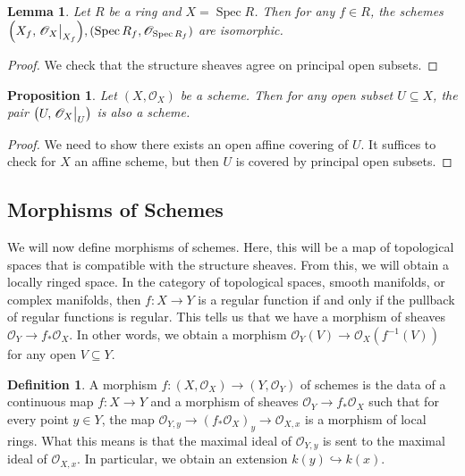 \documentclass[leqno, openany]{memoir}
\newtheorem{prop}[thm]{Proposition}
\newtheorem{lem}[thm]{Lemma}
\theoremstyle{definition}
\newtheorem{defn}[thm]{Definition}
\theoremstyle{remark}
\theoremstyle{plain}
\theoremstyle{definition}
\theoremstyle{remark}
\newcommand{\msc}[1]{\mathscr{#1}}
\DeclareMathOperator{\Spec}{Spec}
\begin{document}
\begin{lem}
    Let $R$ be a ring and $X = \Spec R$. Then for any $f \in R$, the schemes $\qty(X_f, \eval{\msc{O}_X}_{X_f}), (\Spec R_f, \msc{O}_{\Spec R_f})$ are isomorphic.
\end{lem}

\begin{proof}
    We check that the structure sheaves agree on principal open subsets.
\end{proof}

\begin{prop}
    Let $(X, \msc{O}_X)$ be a scheme. Then for any open subset $U \subseteq X$, the pair $\qty(U, \eval{\msc{O}_X}_{U})$ is also a scheme.
\end{prop}

\begin{proof}
    We need to show there exists an open affine covering of $U$. It suffices to check for $X$ an affine scheme, but then $U$ is covered by principal open subsets.
\end{proof}

\subsection{Morphisms of Schemes}%
\label{sub:morphisms_of_schemes}

We will now define morphisms of schemes. Here, this will be a map of topological spaces that is compatible with the structure sheaves. From this, we will obtain a locally ringed space. In the category of topological spaces, smooth manifolds, or complex manifolds, then $f \colon X \to Y$ is a regular function if and only if the pullback of regular functions is regular. This tells us that we have a morphism of sheaves $\msc{O}_Y \to f_* \msc{O}_X$. In other words, we obtain a morphism $\msc{O}_Y(V) \to \msc{O}_X(f^{-1}(V))$ for any open $V \subseteq Y$.

\begin{defn}
    A morphism $f \colon (X, \msc{O}_X) \to (Y, \msc{O}_Y)$ of schemes is the data of a continuous map $f \colon X \to Y$ and a morphism of sheaves $\msc{O}_Y \to f_* \msc{O}_X$ such that for every point $y \in Y$, the map $\msc{O}_{Y,y} \to {(f_* \msc{O}_X)}_y \to \msc{O}_{X,x}$ is a morphism of local rings. What this means is that the maximal ideal of $\msc{O}_{Y,y}$ is sent to the maximal ideal of $\msc{O}_{X,x}$. In particular, we obtain an extension $k(y) \hookrightarrow k(x)$.
\end{defn}
\end{document}

